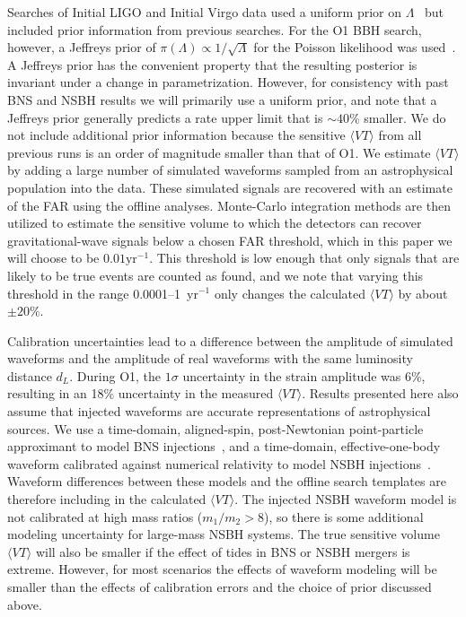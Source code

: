 Searches of Initial \ac{LIGO} and Initial Virgo data used a uniform prior on
$\Lambda$~\citep{Colaboration:2011np} but included prior information from previous searches. 
For the \ac{O1} \ac{BBH} search, however, a Jeffreys prior of
$\pi (\Lambda) \propto 1/\sqrt{\Lambda}$ for the Poisson likelihood was used~\citep{Farr:2013yna,Abbott:2016nhf,TheLIGOScientific:2016pea}.
A Jeffreys prior has the convenient property that the resulting posterior is invariant under a change in parametrization. 
However, for consistency with past BNS and NSBH results we will primarily use a uniform prior, and note that a Jeffreys
prior generally predicts a rate upper limit that is $\sim 40$\% smaller. 
We do not include additional prior information because the sensitive $\langle VT \rangle$ from 
all previous runs is an order of magnitude smaller than that of \ac{O1}.
We estimate $\langle VT \rangle$ by adding a large number of
simulated waveforms sampled from an astrophysical population into the data. 
These simulated signals
are recovered with an estimate of the FAR using the offline analyses.
Monte-Carlo integration methods are then utilized to estimate
the sensitive volume to which the detectors can recover gravitational-wave signals
below a chosen FAR threshold, which in this paper we will choose to be $0.01 \mathrm{yr}^{-1}$.
This threshold is low enough that only signals that are likely to be true events are counted as found, and we 
note that varying this threshold in the range 0.0001--1~yr$^{-1}$ only changes the calculated $\langle VT \rangle$ 
by about $\pm 20\%$.

Calibration uncertainties lead to a difference between the amplitude of simulated
waveforms and the amplitude of real waveforms with the same luminosity distance $d_L$.
During \ac{O1}, the $1\sigma$ uncertainty in the strain amplitude was 6\%, resulting
in an 18\% uncertainty in the measured $\langle VT \rangle$. Results presented here
also assume that injected waveforms are accurate
representations of astrophysical sources. We use a time-domain, aligned-spin,
post-Newtonian point-particle approximant to model \ac{BNS}
injections~\citep{Buonanno:2009zt}, and a time-domain, effective-one-body waveform
calibrated against numerical relativity to model \ac{NSBH}
injections~\citep{Pan:2013rra,Taracchini:2013rva}. Waveform differences between these models and
the offline search templates are therefore including in the calculated $\langle VT \rangle$. 
The injected NSBH waveform model is not calibrated at high mass ratios
($m_1/m_2 >8$), so there is some additional modeling uncertainty for large-mass NSBH
systems. The true sensitive volume $\langle VT \rangle$  will also be smaller if the effect of
tides in \ac{BNS} or \ac{NSBH} mergers is extreme. However, for most scenarios
the effects of waveform modeling will be smaller than the
effects of calibration errors and the choice of prior discussed above. 

